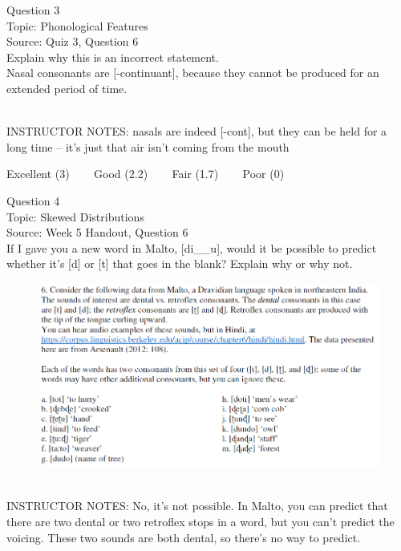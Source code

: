 \documentclass[12pt]{article}
\begin{document}
{\large Question 3}\\

Topic: Phonological Features\\
Source: Quiz 3, Question 6\\

Explain why this is an incorrect statement.\\

Nasal consonants are {[-continuant]}, because they cannot be produced for an extended period of time.


~\\
INSTRUCTOR NOTES: nasals are indeed [-cont], but they can be held for a long time -- it's just that air isn't coming from the mouth


\vfill
Excellent (3) ~~~ Good (2.2) ~~~ Fair (1.7) ~~~ Poor (0)
\newpage

{\large Question 4}\\

Topic: Skewed Distributions\\
Source: Week 5 Handout, Question 6\\

If I gave you a new word in Malto, [di\_\_u], would it be possible to predict whether it's [d] or [t] that goes in the blank? Explain why or why not.\\

\begin{figure}[H]
\includegraphics{../images/malto.png}
\end{figure}

~\\
INSTRUCTOR NOTES: No, it's not possible. In Malto, you can predict that there are two dental or two retroflex stops in a word, but you can't predict the voicing. These two sounds are both dental, so there's no way to predict.
\end{document}
